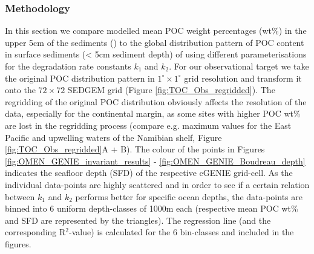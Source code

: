 \documentclass[gmd, manuscript]{copernicus}
\begin{document}
\subsubsection{Methodology}
In this section we compare modelled mean POC weight percentages (wt\%) in the upper 5cm of the sediments  () to the global distribution pattern of POC content in surface sediments 
(< 5cm sediment depth) of \citet{seiter_organic_2004} using different parameterisations for the degradation rate constants $k_1$ and $k_2$. 
For our observational target we take the original POC distribution pattern in $1^\circ \times 1^\circ$ grid resolution \citep[interpolated from > 5500 measurements, compare][]{seiter_organic_2004} and transform it onto the $72\times 72$ SEDGEM grid 
(Figure \ref{fig:TOC_Obs_regridded}). The regridding of the original POC distribution obviously affects the resolution of the data, especially for the continental margin, as some sites with higher POC wt\% are lost in the 
regridding process (compare e.g. maximum values for the East Pacific and upwelling waters of the Namibian shelf, Figure \ref{fig:TOC_Obs_regridded}A + B). 
The colour of the points in Figures \ref{fig:OMEN_GENIE_invariant_results} - \ref{fig:OMEN_GENIE_Boudreau_depth} %
indicates the seafloor depth (SFD) of the respective cGENIE grid-cell. 
As the individual data-points are highly scattered and 
in order to see if a certain relation between $k_1$ and $k_2$ performs better for specific ocean depths, the data-points are binned into 6 uniform depth-classes of 1000m each (respective mean POC wt\% and SFD are represented by 
the triangles). The regression line (and the corresponding R$^2$-value) is calculated for the 6 bin-classes and included in the figures.
\end{document}
